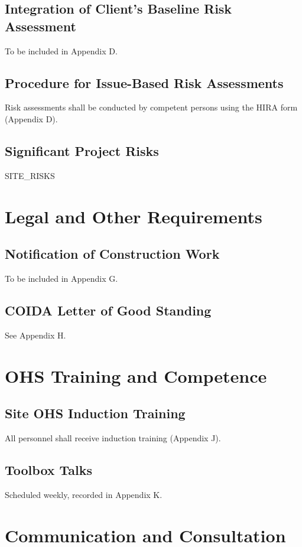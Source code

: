 \documentclass[12pt]{article}
\begin{document}
\subsection{Integration of Client's Baseline Risk Assessment}
To be included in Appendix D.

\subsection{Procedure for Issue-Based Risk Assessments}
Risk assessments shall be conducted by competent persons using the HIRA form (Appendix D).

\subsection{Significant Project Risks}
{{SITE_RISKS}}

\section{Legal and Other Requirements}

\subsection{Notification of Construction Work}
To be included in Appendix G.

\subsection{COIDA Letter of Good Standing}
See Appendix H.

\section{OHS Training and Competence}

\subsection{Site OHS Induction Training}
All personnel shall receive induction training (Appendix J).

\subsection{Toolbox Talks}
Scheduled weekly, recorded in Appendix K.

\section{Communication and Consultation}
\end{document}
